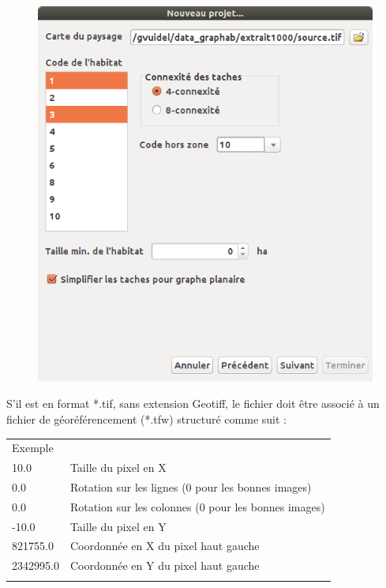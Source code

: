 \documentclass{article}
\begin{document}
\begin{figure}[H]
	\includegraphics[scale=0.5]{img/manual-fr_img3.png} 
\end{figure}

S’il est en format *.tif, sans extension Geotiff, le fichier doit être associé à un fichier de géoréférencement (*.tfw) structuré comme suit :

\begin{table}[H]
\centering
\begin{tabular}{|m{3.552cm}|m{7.0800004cm}}
\hhline{-~}
Exemple & \\
\hhline{-~}
10.0 & Taille du pixel en X\\
0.0 & Rotation sur les lignes (0 pour les bonnes images)\\
0.0 & Rotation sur les colonnes (0 pour les bonnes images)\\
{}-10.0 & Taille du pixel en Y\\
821755.0 & Coordonnée en X du pixel haut gauche\\
2342995.0 & Coordonnée en Y du pixel haut gauche\\
\hhline{-~}
\end{tabular}
\end{table}
\end{document}
